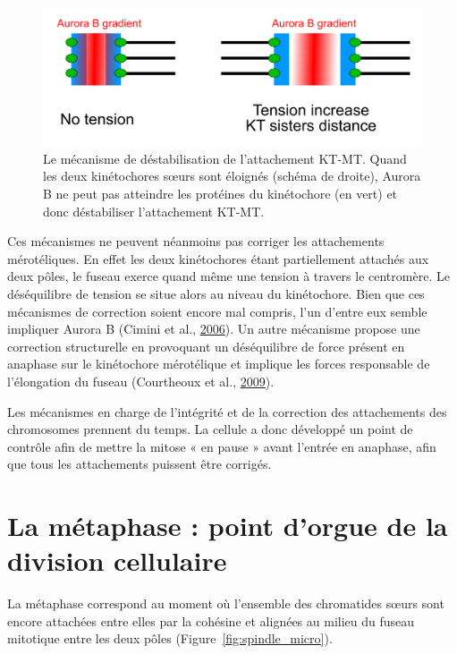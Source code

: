 \documentclass[12pt,a4paper,twoside,openright]{book}
\begin{document}
\begin{figure}[htbp]
\centering
\includegraphics{figures/intro/aurora.png}
\caption[Le mécanisme de déstabilisation de l'attachement KT-MT]{\label{fig:aurora}Le
mécanisme de déstabilisation de l'attachement KT-MT. Quand les deux
kinétochores sœurs sont éloignés (schéma de droite), Aurora B ne peut
pas atteindre les protéines du kinétochore (en vert) et donc
déstabiliser l'attachement KT-MT.}
\end{figure}

Ces mécanismes ne peuvent néanmoins pas corriger les attachements
mérotéliques. En effet les deux kinétochores étant partiellement
attachés aux deux pôles, le fuseau exerce quand même une tension à
travers le centromère. Le déséquilibre de tension se situe alors au
niveau du kinétochore. Bien que ces mécanismes de correction soient
encore mal compris, l'un d'entre eux semble impliquer Aurora B (Cimini
et al., \hyperref[ref-Cimini2006]{2006}). Un autre mécanisme propose une
correction structurelle en provoquant un déséquilibre de force présent
en anaphase sur le kinétochore mérotélique et implique les forces
responsable de l'élongation du fuseau (Courtheoux et al.,
\hyperref[ref-Courtheoux2009]{2009}).

Les mécanismes en charge de l'intégrité et de la correction des
attachements des chromosomes prennent du temps. La cellule a donc
développé un point de contrôle afin de mettre la mitose « en pause »
avant l'entrée en anaphase, afin que tous les attachements puissent être
corrigés.

\section{La métaphase : point d'orgue de la division
cellulaire}\label{la-muxe9taphase-point-dorgue-de-la-division-cellulaire}

La métaphase correspond au moment où l'ensemble des chromatides sœurs
sont encore attachées entre elles par la cohésine et alignées au milieu
du fuseau mitotique entre les deux pôles
(Figure~\ref{fig:spindle_micro}).
\end{document}
